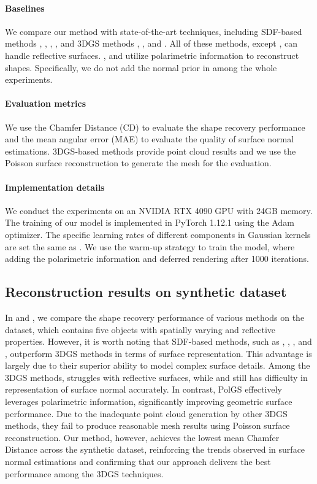 \paragraph{Baselines} 
We compare our method with state-of-the-art techniques, including SDF-based 
methods \nero, \mvas, \pandora, \nersp, and 3DGS methods \gs, \dr, and \relight. 
All of these methods, except \gs, can handle reflective surfaces. \mvas, \pandora and \nersp utilize 
polarimetric information to reconstruct shapes. Specifically, we do not add the normal prior in \gs among the whole experiments.
\vspace{-1em}
\paragraph{Evaluation metrics}
We use the Chamfer Distance (CD) to evaluate the shape recovery performance and 
the mean angular error (MAE) to evaluate the quality of surface normal estimations. 3DGS-based methods provide point cloud results and we use the Poisson surface reconstruction to generate the mesh for the evaluation.
\vspace{-1.2em}
\paragraph{Implementation details}
We conduct the experiments on an NVIDIA RTX 4090 GPU with 24GB memory. The training of our model is implemented in 
PyTorch 1.12.1 using the Adam optimizer. The specific learning rates of different components
in Gaussian kernels are set the same as \gs. We use the warm-up strategy to train the model, where adding the 
polarimetric information and deferred rendering after 1000 iterations.


\subsection{Reconstruction results on synthetic dataset}

In  and , we compare the shape recovery performance of various methods on the \smvp dataset, which contains five objects with spatially varying and reflective properties. However, it is worth noting that SDF-based methods, such as \nero, \mvas, \pandora, and \nersp, outperform 3DGS methods in terms of surface representation. This advantage is largely due to their superior ability to model complex surface details. Among the 3DGS methods, \gs struggles with reflective surfaces, while \dr and \relight still has difficulty in representation of surface normal accurately.
In contrast, PolGS effectively leverages polarimetric information, significantly improving geometric surface performance. Due to the inadequate point cloud generation by other 3DGS methods, they fail to produce reasonable mesh results using Poisson surface reconstruction. Our method, however, achieves the lowest mean Chamfer Distance across the synthetic \smvp dataset, reinforcing the trends observed in surface normal estimations and confirming that our approach delivers the best performance among the 3DGS techniques.

